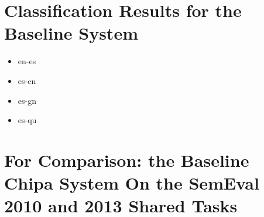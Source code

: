 \section{Classification Results for the Baseline System}

\begin{itemize}
\item en-es
\item es-en
\item es-gn
\item es-qu
\end{itemize}


\section{For Comparison: the Baseline Chipa System On the SemEval 2010 and 2013
Shared Tasks}
\label{sec:baseline-semeval}

